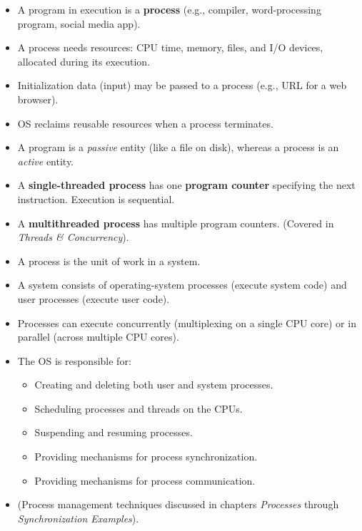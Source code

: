 \documentclass{article}
\begin{document}
\begin{itemize}
    \item A program in execution is a \textbf{process} (e.g., compiler, word-processing program, social media app).
    \item A process needs resources: CPU time, memory, files, and I/O devices, allocated during its execution.
    \item Initialization data (input) may be passed to a process (e.g., URL for a web browser).
    \item OS reclaims reusable resources when a process terminates.
    \item A program is a \textit{passive} entity (like a file on disk), whereas a process is an \textit{active} entity.
    \item A \textbf{single-threaded process} has one \textbf{program counter} specifying the next instruction. Execution is sequential.
    \item A \textbf{multithreaded process} has multiple program counters. (Covered in \textit{Threads \& Concurrency}).
    \item A process is the unit of work in a system.
    \item A system consists of operating-system processes (execute system code) and user processes (execute user code).
    \item Processes can execute concurrently (multiplexing on a single CPU core) or in parallel (across multiple CPU cores).
    \item The OS is responsible for:
    \begin{itemize}
        \item Creating and deleting both user and system processes.
        \item Scheduling processes and threads on the CPUs.
        \item Suspending and resuming processes.
        \item Providing mechanisms for process synchronization.
        \item Providing mechanisms for process communication.
    \end{itemize}
    \item (Process management techniques discussed in chapters \textit{Processes} through \textit{Synchronization Examples}).
\end{itemize}
\end{document}
